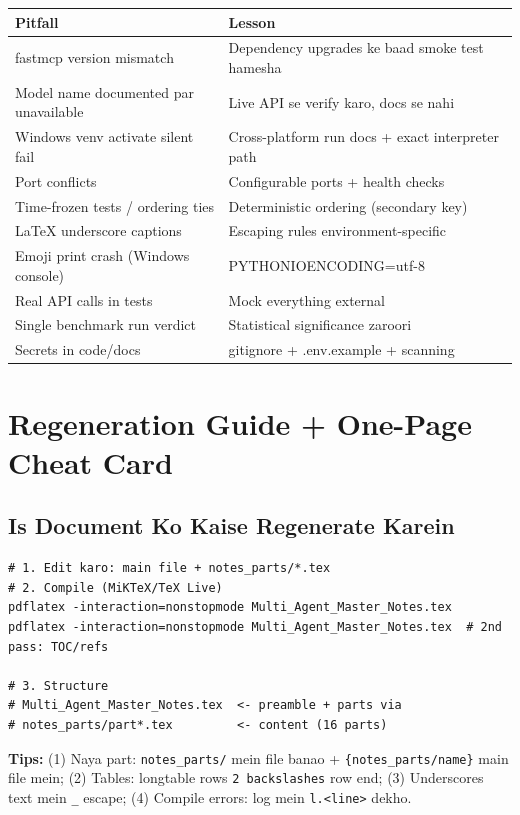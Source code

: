 \begin{longtable}{p{5.4cm} p{8.8cm}}
\toprule
\textbf{Pitfall} & \textbf{Lesson} \\
\midrule
fastmcp version mismatch & Dependency upgrades ke baad smoke test hamesha \\
Model name documented par unavailable & Live API se verify karo, docs se nahi \\
Windows venv activate silent fail & Cross-platform run docs + exact interpreter path \\
Port conflicts & Configurable ports + health checks \\
Time-frozen tests / ordering ties & Deterministic ordering (secondary key) \\
LaTeX underscore captions & Escaping rules environment-specific \\
Emoji print crash (Windows console) & PYTHONIOENCODING=utf-8 \\
Real API calls in tests & Mock everything external \\
Single benchmark run verdict & Statistical significance zaroori \\
Secrets in code/docs & gitignore + .env.example + scanning \\
\bottomrule
\end{longtable}

\section{Regeneration Guide + One-Page Cheat Card}

\subsection{Is Document Ko Kaise Regenerate Karein}

\begin{codestorybox}
\begin{lstlisting}[style=bashstyle]
# 1. Edit karo: main file + notes_parts/*.tex
# 2. Compile (MiKTeX/TeX Live)
pdflatex -interaction=nonstopmode Multi_Agent_Master_Notes.tex
pdflatex -interaction=nonstopmode Multi_Agent_Master_Notes.tex  # 2nd pass: TOC/refs

# 3. Structure
# Multi_Agent_Master_Notes.tex  <- preamble + parts via 
# notes_parts/part*.tex         <- content (16 parts)
\end{lstlisting}

\textbf{Tips:} (1) Naya part: \texttt{notes\_parts/} mein file banao + \texttt{\{notes\_parts/name\}} main file mein; (2) Tables: longtable rows \texttt{2 backslashes} row end; (3) Underscores text mein \texttt{\_} escape; (4) Compile errors: log mein \texttt{l.<line>} dekho.
\end{codestorybox}

